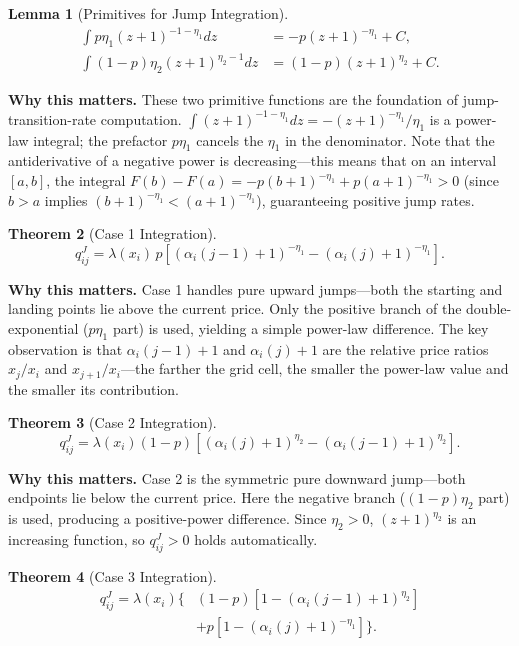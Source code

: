 \documentclass[11pt,a4paper,openany]{book}
\theoremstyle{definition}
\theoremstyle{plain}
\newtheorem{theorem}{Theorem}[chapter]
\newtheorem{lemma}[theorem]{Lemma}
\theoremstyle{remark}
\newcommand{\1}{\mathbbm{1}}
\begin{document}
\begin{lemma}[Primitives for Jump Integration]
\[
\begin{aligned}
\int p \eta_{1} (z+1)^{-1-\eta_{1}} dz &= -p (z+1)^{-\eta_{1}} + C, \\
\int (1-p) \eta_{2} (z+1)^{\eta_{2}-1} dz &= (1-p) (z+1)^{\eta_{2}} + C.
\end{aligned}
\]
\end{lemma}

\medskip
\noindent\textbf{Why this matters.} These two primitive functions are the foundation of jump-transition-rate computation. $\int (z+1)^{-1-\eta_1} dz = -(z+1)^{-\eta_1}/\eta_1$ is a power-law integral; the prefactor $p\eta_1$ cancels the $\eta_1$ in the denominator. Note that the antiderivative of a negative power is decreasing---this means that on an interval $[a,b]$, the integral $F(b) - F(a) = -p(b+1)^{-\eta_1} + p(a+1)^{-\eta_1} > 0$ (since $b > a$ implies $(b+1)^{-\eta_1} < (a+1)^{-\eta_1}$), guaranteeing positive jump rates.

\begin{theorem}[Case 1 Integration]
\[
\boxed{q_{ij}^{J} = \lambda(x_{i}) \, p \left[(\alpha_{i}(j-1)+1)^{-\eta_{1}} - (\alpha_{i}(j)+1)^{-\eta_{1}}\right]}.
\]
\end{theorem}

\medskip
\noindent\textbf{Why this matters.} Case 1 handles pure upward jumps---both the starting and landing points lie above the current price. Only the positive branch of the double-exponential ($p\eta_1$ part) is used, yielding a simple power-law difference. The key observation is that $\alpha_i(j-1)+1$ and $\alpha_i(j)+1$ are the relative price ratios $x_j/x_i$ and $x_{j+1}/x_i$---the farther the grid cell, the smaller the power-law value and the smaller its contribution.

\begin{theorem}[Case 2 Integration]
\[
\boxed{q_{ij}^{J} = \lambda(x_{i}) (1-p) \left[(\alpha_{i}(j)+1)^{\eta_{2}} - (\alpha_{i}(j-1)+1)^{\eta_{2}}\right]}.
\]
\end{theorem}

\medskip
\noindent\textbf{Why this matters.} Case 2 is the symmetric pure downward jump---both endpoints lie below the current price. Here the negative branch ($(1-p)\eta_2$ part) is used, producing a positive-power difference. Since $\eta_2 > 0$, $(z+1)^{\eta_2}$ is an increasing function, so $q_{ij}^J > 0$ holds automatically.

\begin{theorem}[Case 3 Integration]
\[
\boxed{\begin{aligned}
q_{ij}^{J} = \lambda(x_{i}) \Big\{ &(1-p)\left[1 - (\alpha_{i}(j-1)+1)^{\eta_{2}}\right] \\
&+ p\left[1 - (\alpha_{i}(j)+1)^{-\eta_{1}}\right]\Big\}.
\end{aligned}}
\]
\end{theorem}
\end{document}
